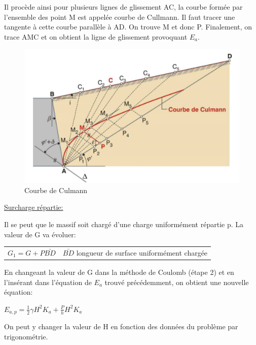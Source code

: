         Il procède ainsi pour plusieurs lignes de glissement AC, la courbe formée par l'ensemble des point M est appelée courbe de Cullmann. Il faut tracer une tangente à cette courbe parallèle à AD. On trouve M et donc P. Finalement, on trace AMC et on obtient la ligne de glissement provoquant $E_a$. 
        
        \begin{figure}[h!]
            \centering
            \includegraphics[scale=1]{Holeyman/images/H49.PNG}
            \caption{Courbe de Culmann}
        \end{figure}
        
        \underline{Surcharge répartie:} 
        
        Il se peut que le massif soit chargé d'une charge uniformément répartie p. La valeur de G va évoluer: 
        \begin{center}
        \begin{tabular}{c|c}
            $G_1 = G + P \bar{BD}$ \: \: \: &  $\bar{BD}$ longueur de surface uniformément chargée 
        \end{tabular}
        \end{center} 
        
        En changeant la valeur de G dans la méthode de Coulomb (étape 2) et en l'insérant dans l'équation de $E_a$ trouvé précédemment, on obtient une nouvelle équation:
        
        \begin{center}
            $E_{a,p} = \frac{1}{2} \gamma H^2 K_a + \frac{P}{h} H^2 K_a$
        \end{center} 
        
        On peut y changer la valeur de H en fonction des données du problème par trigonométrie. 
        
